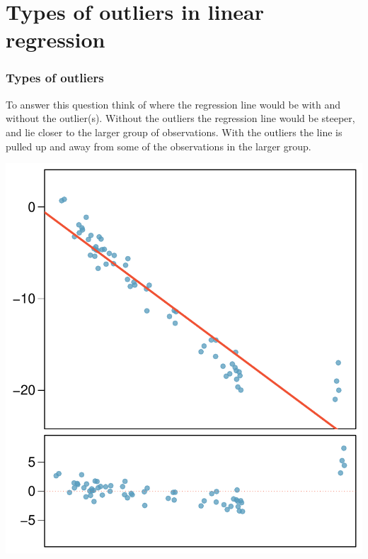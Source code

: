 
\section{Types of outliers in linear regression}


\begin{frame}
\frametitle{Types of outliers}

{

To answer this question think of where the regression line would be with and without the outlier(s). Without the outliers the regression line would be steeper, and lie closer to the larger group of observations. With the outliers the line is pulled up and away from some of the observations in the larger group. 
}
{
\begin{center}
\includegraphics[width=\textwidth]{8-3_outliers/figures/outlierPlots/out4}
\end{center}
}

\end{frame}


